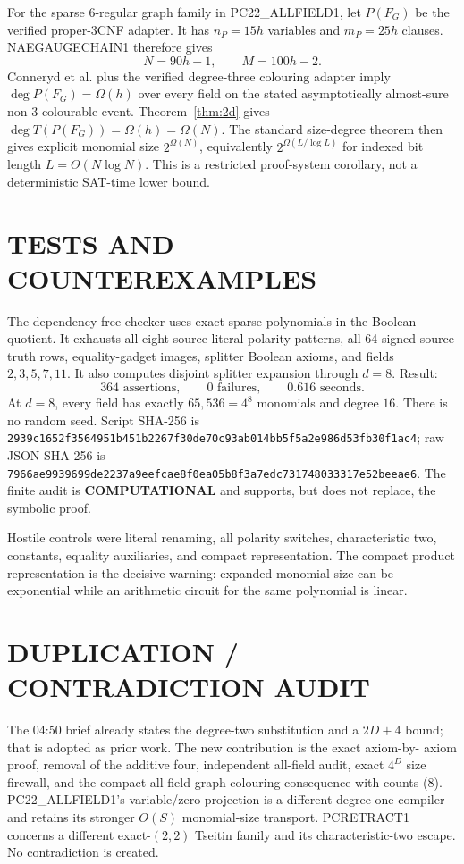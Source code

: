 \documentclass[11pt]{article}
\newcommand{\COMP}{\textbf{COMPUTATIONAL}}
\begin{document}
For the sparse $6$-regular graph family in PC22\_ALLFIELD1, let $P(F_G)$ be
the verified proper-3CNF adapter.  It has $n_P=15h$ variables and $m_P=25h$
clauses.  NAEGAUGECHAIN1 therefore gives
\[
N=90h-1,\qquad M=100h-2.                         \tag{8}
\]
Conneryd et al. plus the verified degree-three colouring adapter imply
$\deg P(F_G)=\Omega(h)$ over every field on the stated asymptotically
almost-sure non-3-colourable event.  Theorem~\ref{thm:2d} gives
$\deg T(P(F_G))=\Omega(h)=\Omega(N)$.  The standard size-degree theorem then
gives explicit monomial size $2^{\Omega(N)}$, equivalently
$2^{\Omega(L/\log L)}$ for indexed bit length $L=\Theta(N\log N)$.
This is a restricted proof-system corollary, not a deterministic SAT-time
lower bound.

\section{TESTS AND COUNTEREXAMPLES}
The dependency-free checker
 uses exact sparse
polynomials in the Boolean quotient.  It exhausts all eight source-literal
polarity patterns, all 64 signed source truth rows, equality-gadget images,
splitter Boolean axioms, and fields $2,3,5,7,11$.  It also computes disjoint
splitter expansion through $d=8$.  Result:
\[
364\text{ assertions},\qquad 0\text{ failures},\qquad 0.616\text{ seconds}.
\]
At $d=8$, every field has exactly $65{,}536=4^8$ monomials and degree $16$.
There is no random seed.  Script SHA-256 is
\texttt{2939c1652f3564951b451b2267f30de70c93ab014bb5f5a2e986d53fb30f1ac4};
raw JSON SHA-256 is
\texttt{7966ae9939699de2237a9eefcae8f0ea05b8f3a7edc731748033317e52beeae6}.
The finite audit is \COMP{} and supports, but does not replace, the symbolic
proof.

Hostile controls were literal renaming, all polarity switches,
characteristic two, constants, equality auxiliaries, and compact
representation.  The compact product representation is the decisive warning:
expanded monomial size can be exponential while an arithmetic circuit for the
same polynomial is linear.

\section{DUPLICATION / CONTRADICTION AUDIT}
The 04:50 brief already states the degree-two substitution and a $2D+4$ bound;
that is adopted as prior work.  The new contribution is the exact axiom-by-
axiom proof, removal of the additive four, independent all-field audit, exact
$4^D$ size firewall, and the compact all-field graph-colouring consequence
with counts (8).  PC22\_ALLFIELD1's variable/zero projection is a different
degree-one compiler and retains its stronger $O(S)$ monomial-size transport.
PCRETRACT1 concerns a different exact-$(2,2)$ Tseitin family and its
characteristic-two escape.  No contradiction is created.
\end{document}
